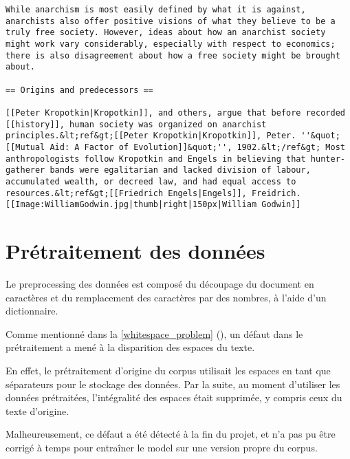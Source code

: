 \begin{lstlisting}[caption={Extrait des premières lignes du fichier enwik8},label=enwik8_ex]
While anarchism is most easily defined by what it is against, anarchists also offer positive visions of what they believe to be a truly free society. However, ideas about how an anarchist society might work vary considerably, especially with respect to economics; there is also disagreement about how a free society might be brought about. 

== Origins and predecessors ==

[[Peter Kropotkin|Kropotkin]], and others, argue that before recorded [[history]], human society was organized on anarchist principles.&lt;ref&gt;[[Peter Kropotkin|Kropotkin]], Peter. ''&quot;[[Mutual Aid: A Factor of Evolution]]&quot;'', 1902.&lt;/ref&gt; Most anthropologists follow Kropotkin and Engels in believing that hunter-gatherer bands were egalitarian and lacked division of labour, accumulated wealth, or decreed law, and had equal access to resources.&lt;ref&gt;[[Friedrich Engels|Engels]], Freidrich.
[[Image:WilliamGodwin.jpg|thumb|right|150px|William Godwin]]
\end{lstlisting}

\section{Prétraitement des données}
Le \gls{preprocessing} des données est composé du découpage du document en caractères et du remplacement des caractères par des nombres, à l'aide d'un dictionnaire.

Comme mentionné dans la \autoref{whitespace_problem} (), un défaut dans le prétraitement a mené à la disparition des espaces du texte.

En effet, le prétraitement d'origine du corpus utilisait les espaces en tant que séparateurs pour le stockage des données. Par la suite, au moment d'utiliser les données prétraitées, l'intégralité des espaces était supprimée, y compris ceux du texte d'origine.

Malheureusement, ce défaut a été détecté à la fin du projet, et n'a pas pu être corrigé à temps pour entraîner le \gls{model} sur une version propre du \gls{corpus}.
